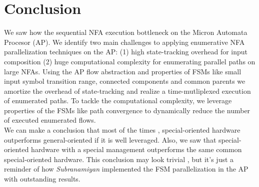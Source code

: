 \section{Conclusion}
We saw how the sequential NFA execution bottleneck on the Micron Automata Procesor (AP). We identify two main
challenges to applying enumerative NFA parallelization techniques
on the AP: (1) high state-tracking overhead for input composition (2)
huge computational complexity for enumerating parallel paths on
large NFAs. Using the AP flow abstraction and properties of FSMs
like small input symbol transition range, connected components and
common parents we amortize the overhead of state-tracking and
realize a time-mutliplexed execution of enumerated paths. To tackle
the computational complexity, we leverage properties of the FSMs
like path convergence to dynamically reduce the number of executed
enumerated flows.\\
We can make a conclusion that most of the times , special-oriented hardware outperforms general-oriented if it is well leveraged. Also, we saw that special-oriented hardware with a special management outperforms the same common special-oriented hardware.
This conclusion may look trivial , but it's just a reminder of how \textit{Subranamiyan} \cite{} implemented the FSM parallelization in the AP with outstanding results.